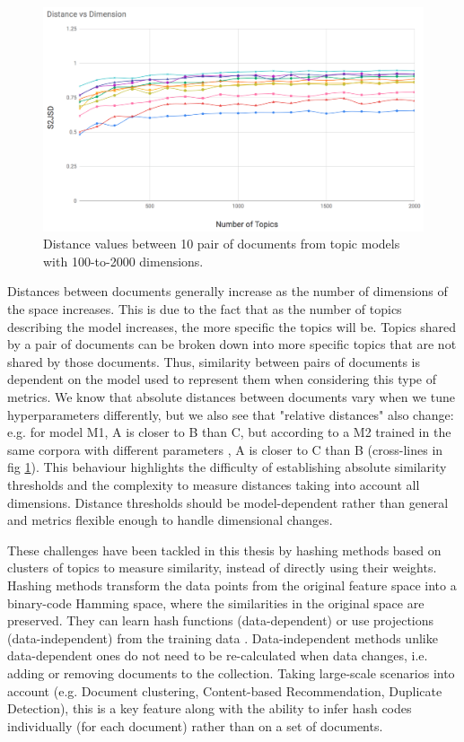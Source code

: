 \begin{figure}
\begin{adjustbox}{minipage=0.45\linewidth,frame=1pt 5pt}
\end{adjustbox}
\hfill
\begin{adjustbox}{minipage=0.45\linewidth,frame=1pt 5pt}
\includegraphics[width=\linewidth]{S2JSD_100_2k.png}
\end{adjustbox}
\caption{Distance values between 10 pair of documents from topic models with 100-to-2000 dimensions.}
\label{fig:topic_distances}
\end{figure}

Distances between documents generally increase as the number of dimensions of the space increases. This is due to the fact that as the number of topics describing the model increases, the more specific the topics will be. Topics shared by a pair of documents can be broken down into more specific topics that are not shared by those documents. Thus, similarity between pairs of documents is dependent on the model used to represent them when considering this type of metrics. We know that absolute distances between documents vary when we tune hyperparameters differently, but we also see that "relative distances" also change: e.g. for model M1, A is closer to B than C, but according to a M2 trained in the same corpora with different parameters , A is closer to C than B (cross-lines in fig \ref{fig:topic_distances}). This behaviour highlights the difficulty of establishing absolute similarity thresholds and the complexity to measure distances taking into account all dimensions. Distance thresholds should be model-dependent rather than general and metrics flexible enough to handle dimensional changes. 

These challenges have been tackled in this thesis by hashing methods based on clusters of topics to measure similarity, instead of directly using their weights. Hashing methods transform the data points from the original feature space into a binary-code Hamming space, where the similarities in the original space are preserved. They can learn hash functions (data-dependent) or use projections (data-independent) from the training data \cite{Wang2016}. Data-independent methods unlike data-dependent ones do not need to be re-calculated when data changes, i.e. adding or removing documents to the collection. Taking large-scale scenarios into account (e.g. Document clustering, Content-based Recommendation, Duplicate Detection), this is a key feature along with the ability to infer hash codes individually (for each document) rather than on a set of documents. 

